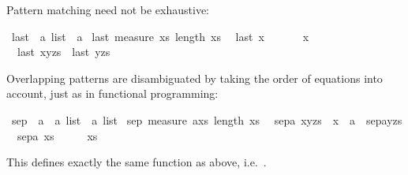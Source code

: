 \begin{isabellebody}
\begin{isamarkuptext}
Pattern matching need not be exhaustive:%
\end{isamarkuptext}%
\ last\ {\isacharcolon}{\isacharcolon}\ {\isachardoublequote}{\isacharprime}a\ list\ {\isasymRightarrow}\ {\isacharprime}a{\isachardoublequote}\isanewline
{}\ last\ {\isachardoublequote}measure\ {\isacharparenleft}{\isasymlambda}xs{\isachardot}\ length\ xs{\isacharparenright}{\isachardoublequote}\isanewline
\ \ {\isachardoublequote}last\ {\isacharbrackleft}x{\isacharbrackright}\ \ \ \ \ \ {\isacharequal}\ x{\isachardoublequote}\isanewline
\ \ {\isachardoublequote}last\ {\isacharparenleft}x{\isacharhash}y{\isacharhash}zs{\isacharparenright}\ {\isacharequal}\ last\ {\isacharparenleft}y{\isacharhash}zs{\isacharparenright}{\isachardoublequote}%
\begin{isamarkuptext}%
Overlapping patterns are disambiguated by taking the order of equations into
account, just as in functional programming:%
\end{isamarkuptext}%
\ sep{}\ {\isacharcolon}{\isacharcolon}\ {\isachardoublequote}{\isacharprime}a\ {\isasymtimes}\ {\isacharprime}a\ list\ {\isasymRightarrow}\ {\isacharprime}a\ list{\isachardoublequote}\isanewline
{}\ sep{}\ {\isachardoublequote}measure\ {\isacharparenleft}{\isasymlambda}{\isacharparenleft}a{\isacharcomma}xs{\isacharparenright}{\isachardot}\ length\ xs{\isacharparenright}{\isachardoublequote}\isanewline
\ \ {\isachardoublequote}sep{}{\isacharparenleft}a{\isacharcomma}\ x{\isacharhash}y{\isacharhash}zs{\isacharparenright}\ {\isacharequal}\ x\ {\isacharhash}\ a\ {\isacharhash}\ sep{}{\isacharparenleft}a{\isacharcomma}y{\isacharhash}zs{\isacharparenright}{\isachardoublequote}\isanewline
\ \ {\isachardoublequote}sep{}{\isacharparenleft}a{\isacharcomma}\ xs{\isacharparenright}\ \ \ \ \ {\isacharequal}\ xs{\isachardoublequote}%
\begin{isamarkuptext}%
\noindent
This defines exactly the same function as  above, i.e.\
.


\end{isamarkuptext}
\end{isabellebody}

